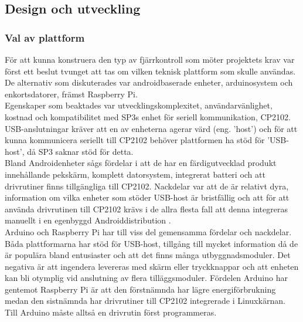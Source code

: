 \documentclass{article}
\begin{document}
        \subsection{Design och utveckling} %
        \label{sub:design_och_utveckling}
        
            \subsubsection{Val av plattform} %
            \label{subsub:val_av_plattform}
            För att kunna konstruera den typ av fjärrkontroll som möter projektets krav var först ett beslut tvunget att tas om vilken teknisk plattform som skulle användas. De alternativ som diskuterades var androidbaserade enheter, arduinosystem och enkortsdatorer, främst Raspberry Pi.\\
            
            \noindent Egenskaper som beaktades var utvecklingskomplexitet, användarvänlighet, kostnad och kompatibilitet med SP3s enhet för seriell kommunikation, CP2102. USB-anslutningar kräver att en av enheterna agerar värd (eng. 'host') och för att kunna kommunicera seriellt till CP2102 behöver plattformen ha stöd för 'USB-host', då SP3 saknar stöd för detta. \\
            
            \noindent Bland Androidenheter sågs fördelar i att de har en färdigutvecklad produkt innehållande pekskärm, komplett datorsystem, integrerat batteri och att drivrutiner finns tillgängliga till CP2102. Nackdelar var att de är relativt dyra, information om vilka enheter som stöder USB-host är bristfällig och att för att använda drivrutinen till CP2102 krävs i de allra flesta fall att denna integreras manuellt i en egenbyggd Androiddistribution \cite{SL_AN809}. \\
            
            \noindent Arduino och Raspberry Pi har till viss del gemensamma fördelar och nackdelar. Båda plattformarna har stöd för USB-host, tillgång till mycket information då de är populära bland entusiaster och att det finns många utbyggnadsmoduler. Det negativa är att ingendera levereras med skärm eller tryckknappar och att enheten kan bli otymplig vid anslutning av flera tilläggsmoduler. Fördelen Arduino har gentemot Raspberry Pi är att den förstnämnda har lägre energiförbrukning medan den sistnämnda har drivrutiner till CP2102 integrerade i Linuxkärnan. Till Arduino måste alltså en drivrutin först programmeras. \\
\end{document}
